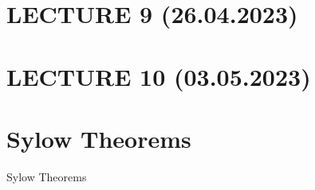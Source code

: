 \documentclass[12pt, a4paper]{article}
\theoremstyle{definition}
\begin{document}
\section{LECTURE 9 (26.04.2023)}
\newpage
\section{LECTURE 10 (03.05.2023)}
\newpage
\appendix
\section{Sylow Theorems}
Sylow Theorems\cite{milneGT}
\newpage

\clearpage
{}

\end{document}
